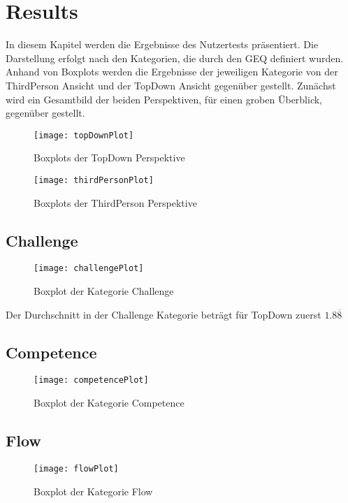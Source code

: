 \chapter{Results} %
In diesem Kapitel werden die Ergebnisse des Nutzertests präsentiert. Die Darstellung erfolgt nach den Kategorien, die durch den GEQ definiert wurden. Anhand von Boxplots werden die Ergebnisse der jeweiligen Kategorie von der ThirdPerson Ansicht und der TopDown Ansicht gegenüber gestellt.
Zunächst wird ein Gesamtbild der beiden Perspektiven, für einen groben Überblick, gegenüber gestellt.
\begin{figure}[h!tb]
	\centering
	\texttt{[image: topDownPlot]}
	\caption{Boxplots der TopDown Perspektive\label{fig:topdownbox}}
\end{figure}
\begin{figure}[h!tb]
	\centering
	\texttt{[image: thirdPersonPlot]}
	\caption{Boxplots der ThirdPerson Perspektive\label{fig:thirdpersonbox}}
\end{figure}
\section{Challenge}
\begin{figure}[h!tb]
	\centering
	\texttt{[image: challengePlot]}
	\caption{Boxplot der Kategorie Challenge\label{fig:challengebox}}
\end{figure}
Der Durchschnitt in der Challenge Kategorie beträgt für TopDown zuerst $1.8\overline{8}$
\section{Competence}
\begin{figure}[h!tb]
	\centering
	\texttt{[image: competencePlot]}
	\caption{Boxplot der Kategorie Competence\label{fig:competencebox}}
\end{figure}

\section{Flow}
\begin{figure}[h!tb]
	\centering
	\texttt{[image: flowPlot]}
	\caption{Boxplot der Kategorie Flow\label{fig:flowbox}}
\end{figure}

